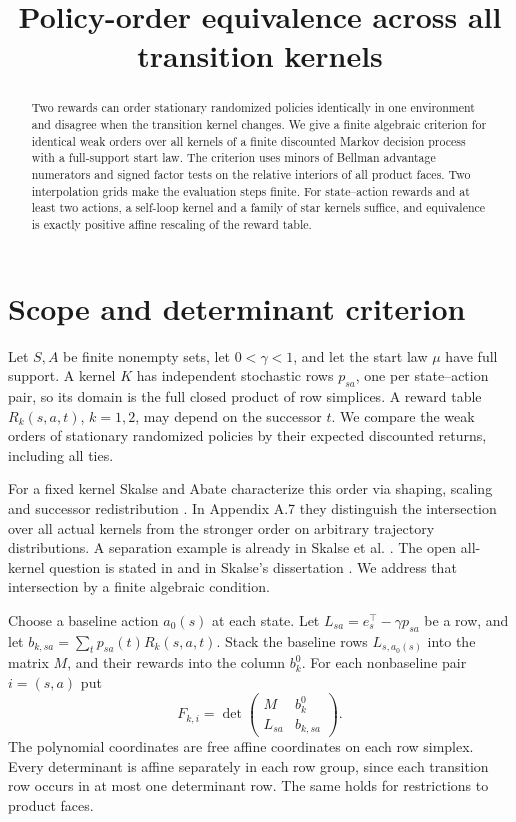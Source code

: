 \documentclass[11pt,a4paper]{amsart}
\title[All-kernel policy-order equivalence]{Policy-order equivalence across all transition kernels}
\date{}
\begin{document}
\begin{abstract}
Two rewards can order stationary randomized policies identically in one environment and disagree when the transition kernel changes. We give a finite algebraic criterion for identical weak orders over all kernels of a finite discounted Markov decision process with a full-support start law. The criterion uses minors of Bellman advantage numerators and signed factor tests on the relative interiors of all product faces. Two interpolation grids make the evaluation steps finite. For state--action rewards and at least two actions, a self-loop kernel and a family of star kernels suffice, and equivalence is exactly positive affine rescaling of the reward table.
\end{abstract}
\maketitle

\section{Scope and determinant criterion}
Let $S,A$ be finite nonempty sets, let $0<\gamma<1$, and let the start law $\mu$ have full support. A kernel $K$ has independent stochastic rows $p_{sa}$, one per state--action pair, so its domain is the full closed product of row simplices. A reward table $R_k(s,a,t)$, $k=1,2$, may depend on the successor $t$. We compare the weak orders of stationary randomized policies by their expected discounted returns, including all ties.

For a fixed kernel Skalse and Abate characterize this order via shaping, scaling and successor redistribution \cite[Theorem~26]{skalse}. In Appendix A.7 they distinguish the intersection over all actual kernels from the stronger order on arbitrary trajectory distributions. A separation example is already in Skalse et al. \cite[Theorem~5]{starc}. The open all-kernel question is stated in \cite[Appendix~A.7, p.~94]{skalse} and in Skalse's dissertation \cite[p.~183]{thesis}. We address that intersection by a finite algebraic condition.

Choose a baseline action $a_0(s)$ at each state. Let $L_{sa}=e_s^{\top}-\gamma p_{sa}$ be a row, and let $b_{k,sa}=\sum_t p_{sa}(t)R_k(s,a,t)$. Stack the baseline rows $L_{s,a_0(s)}$ into the matrix $M$, and their rewards into the column $b_k^0$. For each nonbaseline pair $i=(s,a)$ put
\[
   F_{k,i}=\det\begin{pmatrix}M&b_k^0\\ L_{sa}&b_{k,sa}\end{pmatrix}.
\]
The polynomial coordinates are free affine coordinates on each row simplex. Every determinant is affine separately in each row group, since each transition row occurs in at most one determinant row. The same holds for restrictions to product faces.
\end{document}
